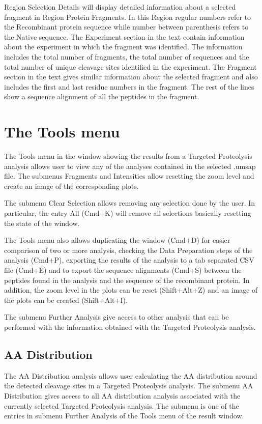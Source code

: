 Region Selection Details will display detailed information about a selected fragment
in Region Protein Fragments. In this Region regular numbers refer to the Recombinant
protein sequence while number between parenthesis refers to the Native sequence.
The Experiment section in the text contain information about the experiment in which
the fragment was identified. The information includes the total number of fragments,
the total number of sequences and the total number of unique cleavage sites identified
in the experiment. The Fragment section in the text gives similar information about
the selected fragment and also includes the first and last residue numbers in the
fragment. The rest of the lines show a sequence alignment of all the peptides in
the fragment.

\section{The Tools menu}

The Tools menu in the window showing the results from a Targeted Proteolysis analysis
allows user to view any of the analyses contained in the selected .umsap file. The
submenus Fragments and Intensities allow resetting the zoom level and create an image
of the corresponding plots.

The submenu Clear Selection allows removing any selection done by the user. In
particular, the entry All (Cmd+K) will remove all selections basically resetting
the state of the window.

The Tools menu also allows duplicating the window (Cmd+D) for easier comparison of
two or more analysis, checking the Data Preparation steps of the analysis (Cmd+P),
exporting the results of the analysis to a tab separated CSV file (Cmd+E) and to
export the sequence alignments (Cmd+S) between the peptides found in the analysis
and the sequence of the recombinant protein. In addition, the zoom level in the plots
can be reset (Shift+Alt+Z) and an image of the plots can be created (Shift+Alt+I).

The submenu Further Analysis give access to other analysis that can be performed
with the information obtained with the Targeted Proteolysis analysis.

\subsection{AA Distribution}
\label{subsec:tarprotAA}
The AA Distribution analysis allows user calculating the AA distribution around
the detected cleavage sites in a Targeted Proteolysis analysis. The submenu AA Distribution
gives access to all AA distribution analysis associated with the currently selected
Targeted Proteolysis analysis. The submenu is one of the entries in submenu Further
Analysis of the Tools menu of the result window.


